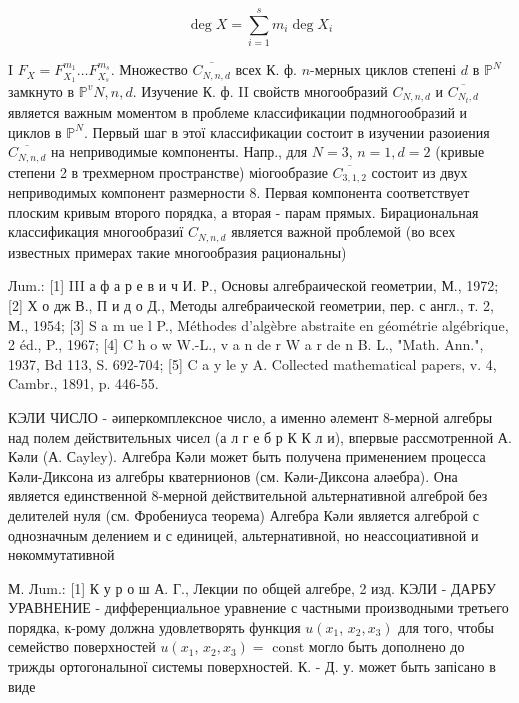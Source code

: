 \documentclass[10pt]{article}
\begin{document}
\[

\operatorname{deg} X=\sum_{i=1}^{s} m_{i} \operatorname{deg} X_{i}

\]



I $F_{X}=F_{X_{1}}^{m_{1}} \ldots F_{X_{s}}^{m_{s}}$. Множество $\overline{C_{N, n, d}}$ всех К. ф. $n$-мерных циклов степені $d$ в $\mathbb{P}^{N}$ замкнуто в $\mathbb{P}^{v} N, n, d$. Изучение К. ф. II свойств многообразий $C_{N, n, d}$ и $\overline{C_{N_{t}, d}}$ является важным моментом в проблеме классификации подмногообразий и циклов в $\mathbb{P}^{N}$. Первый шаг в этої классификации состоит в изучении разоиения $\overline{C_{N, n, d}}$ на неприводимые компоненты. Напр., для $N=3$, $n=1, d=2$ (кривые степени 2 в трехмерном пространстве) міогообразие $\overline{C_{3,1,2}}$ состоит из двух неприводимых компонент размерности 8. Первая компонента соответствует плоским кривым второго порядка, а вторая - парам прямых. Бирациональная классификация многообразиї $C_{N, n, d}$ является важной проблемой (во всех известных примерах такие многообразия рациональны)



Лum.: [1] III а ф а р е в и ч И. Р., Основы алгебраической геометрии, М., 1972; [2] Х о дж В., П и д о Д., Методы алгебраической геометрии, пер. с англ., т. 2, М., 1954; [3] S a m ue l P., Méthodes d'algèbre abstraite en géométrie algébrique, 2 éd., P., 1967; [4] C h o w W.-L., v a n de r W a r de n B. L., "Math. Ann.", 1937, Bd 113, S. 692-704; [5] C a y le y A. Collected mathematical papers, v. 4, Cambr., 1891, p. 446-55.



КЭЛИ ЧИСЛО - әиперкомплексное число, а именно әлемент 8-мерной алгебры над полем действительных чисел (а л г е б р К К л и), впервые рассмотренной А. Кәли (А. Сayley). Алгебра Кәли может быть получена применением процесса Кәли-Диксона из алгебры кватернионов (см. Кәли-Диксона аләебра). Она является единственной 8-мерной действительной альтернативной алгеброй без делителей нуля (см. Фробениуса теорема) Алгебра Кәли является алгеброй с однозначным делением и с единицей, альтернативной, но неассоциативной и нөкоммутативной



М. Лum.: [1] К у р о ш А. Г., Лекции по общей алгебре, 2 изд. КЭЛИ - ДАРБУ УРАВНЕНИЕ - дифференциальное уравнение с частными производными третьего порядка, к-рому должна удовлетворять функция $u\left(x_{1}\right.$, $\left.x_{2}, x_{3}\right)$ для того, чтобы семейство поверхностей $u\left(x_{1}\right.$, $\left.x_{2}, x_{3}\right)=$ const могло быть дополнено до трижды ортогоналыної системы поверхностей. К. - Д. у. может быть запісано в виде
\end{document}
